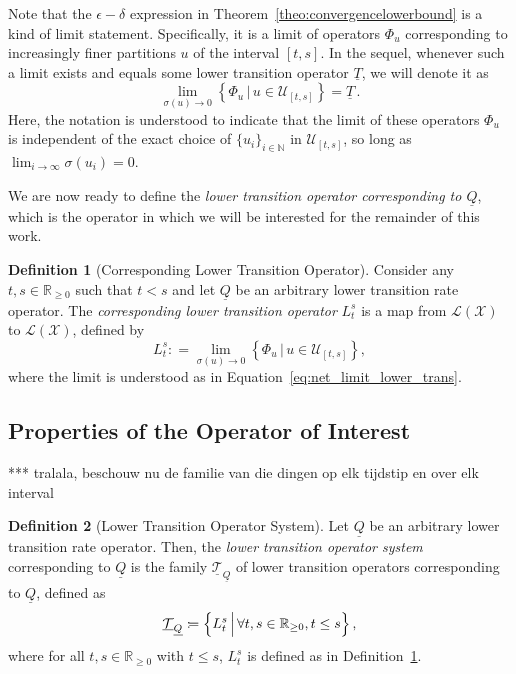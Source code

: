 \documentclass[10pt]{paper}
\theoremstyle{definition}
\newtheorem{definition}{Definition}
\newcommand{\nats}{\mathbb{N}}
\newcommand{\reals}{\mathbb{R}}
\newcommand{\realsnonneg}{\reals_{\geq 0}}
\newcommand{\states}{\mathcal{X}}
\newcommand{\lt}{\underline{T}}
\newcommand{\lbound}{L}
\newcommand{\gambles}{\mathcal{L}}
\newcommand{\gamblesX}{\gambles(\states)}
\newcommand{\lrate}{\underline{Q}}
\newcommand{\coloneqq}{:\!=}
\begin{document}
Note that the $\epsilon-\delta$ expression in Theorem~\ref{theo:convergencelowerbound} is a kind of limit statement. Specifically, it is a limit of operators $\Phi_{u}$ corresponding to increasingly finer partitions $u$ of the interval $[t,s]$. In the sequel, whenever such a limit exists and equals some lower transition operator $\lt$, we will denote it as
\begin{equation}\label{eq:net_limit_lower_trans}
\lim_{\sigma(u)\to0}\left\{\Phi_u\,\big\vert\,u\in\mathcal{U}_{[t,s]}\right\} = \lt\,.
\end{equation}
Here, the notation is understood to indicate that the limit of these operators $\Phi_{u}$ is independent of the exact choice of $\{u_i\}_{i\in\nats}$ in $\mathcal{U}_{[t,s]}$, so long as $\lim_{i\to\infty}\sigma(u_i)=0$.

We are now ready to define the \emph{lower transition operator corresponding to $\lrate$}, which is the operator in which we will be interested for the remainder of this work.

\begin{definition}[Corresponding Lower Transition Operator]\label{def:low_trans}
Consider any $t,s\in\realsnonneg$ such that $t<s$ and let $\lrate$ be an arbitrary lower transition rate operator. The \emph{corresponding lower transition operator} $\lbound_t^s$ is a map from $\gamblesX$ to $\gamblesX$, defined by
\begin{equation}\label{eq:lowerbound}
\lbound_t^s\coloneqq\lim_{\sigma(u)\to0}\left\{ \Phi_u\,\big\vert\,u\in\mathcal{U}_{[t,s]}\right\},
\end{equation}
where the limit is understood as in Equation~\eqref{eq:net_limit_lower_trans}.
\end{definition}

\subsection{Properties of the Operator of Interest}

*** tralala, beschouw nu de familie van die dingen op elk tijdstip en over elk interval

\begin{definition}[Lower Transition Operator System]
Let $\lrate$ be an arbitrary lower transition rate operator. Then, the \emph{lower transition operator system} corresponding to $\lrate$ is the family $\underline{\mathcal{T}}_{\lrate}$ of lower transition operators corresponding to $\lrate$, defined as
\begin{equation*}
\underline{\mathcal{T}}_{\lrate} \coloneqq \Bigl\{L_t^s\,\Big\vert\,\forall t,s\in\realsnonneg, t\leq s\Bigr\}\,,
\end{equation*}
where for all $t,s\in\realsnonneg$ with $t\leq s$, $L_t^s$ is defined as in Definition~\ref{def:low_trans}.
\end{definition}
\end{document}
